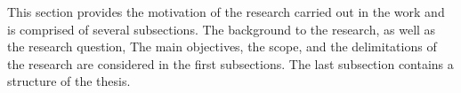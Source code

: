 %
%
This section provides the motivation of the research carried out in the work and is comprised of several subsections. 
%
The background to the research, as well as the research question, The main objectives, the scope, and the delimitations of the research are considered in the first subsections. 
%
The last subsection contains a structure of the thesis. 